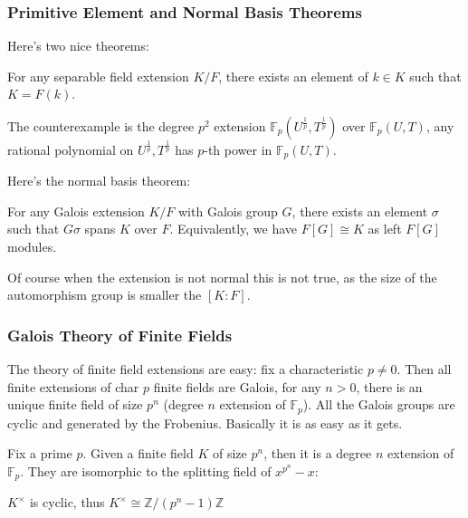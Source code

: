 \documentclass[main.tex]{subfiles}
\begin{document}
\subsubsection{Primitive Element and Normal Basis Theorems}

Here's two nice theorems:
\begin{theorem}
For any separable field extension $K/F$, there exists an element of $k \in K$ such that $K = F(k)$.
\end{theorem}

\begin{remark}
The counterexample is the degree $p^2$ extension $\mathbb{F}_p(U^\frac{1}{p}, T^\frac{1}{p})$ over $\mathbb{F}_p(U,T)$, any rational polynomial on $U^\frac{1}{p}, T^\frac{1}{p}$ has $p$-th power in $\mathbb{F}_p(U,T)$.
\end{remark}

Here's the normal basis theorem:
\begin{theorem}
For any Galois extension $K/F$ with Galois group $G$, there exists an element $\sigma$ such that $G \sigma$ spans $K$ over $F$. Equivalently, we have $F[G] \cong K$ as left $F[G]$ modules. 
\end{theorem}

\begin{remark}
Of course when the extension is not normal this is not true, as the size of the automorphism group is smaller the $[K:F]$.
\end{remark}

\subsubsection{Galois Theory of Finite Fields}

The theory of finite field extensions are easy: fix a characteristic $p \neq 0$. Then all finite extensions of char $p$ finite fields are Galois, for any $n > 0$, there is an unique finite field of size $p^n$ (degree $n$ extension of $\mathbb{F}_p$). All the Galois groups are cyclic and generated by the Frobenius. Basically it is as easy as it gets.

Fix a prime $p$. Given a finite field $K$ of size $p^n$, then it is a degree $n$ extension of $\mathbb{F}_p$. They are isomorphic to the splitting field of $x^{p^n} - x$:

\begin{lemma}
$K^\times$ is cyclic, thus $K^\times \cong \mathbb{Z}/(p^n - 1)\mathbb{Z} $
\end{lemma}
\end{document}

